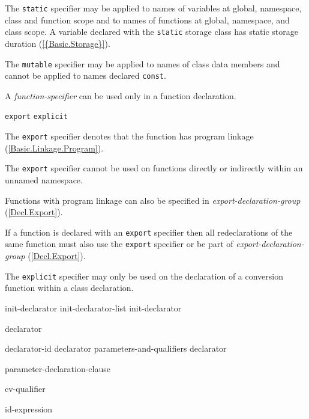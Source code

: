 \p The \texttt{static} specifier may be applied to names of variables at global,
namespace, class and function scope and to names of functions at global,
namespace, and class scope. A variable declared with the \texttt{static} storage
class has static storage duration (\ref{{Basic.Storage}}).

\p The \texttt{mutable} specifier may be applied to names of class data members
and cannot be applied to names declared \texttt{const}.


\p A \textit{function-specifier} can be used only in a function declaration.

\begin{grammar}
  \br
  \texttt{export}\br
  \texttt{explicit}
\end{grammar}

\p The \texttt{export} specifier denotes that the function has program linkage (\ref{Basic.Linkage.Program}).

\p The \texttt{export} specifier cannot be used on functions directly or indirectly within an unnamed namespace.

\p Functions with program linkage can also be specified in \textit{export-declaration-group} (\ref{Decl.Export}).

\p If a function is declared with an \texttt{export} specifier then all redeclarations of the same function must also use the \texttt{export} specifier or be part of \textit{export-declaration-group} (\ref{Decl.Export}).

\p The \texttt{explicit} specifier may only be used on the declaration of a
conversion function within a class declaration.


\begin{grammar}
  \br
  init-declarator\br
  init-declarator-list \terminal{,} init-declarator\br

  \br
  declarator \br

  \br
  declarator-id \br
  declarator parameters-and-qualifiers\br
  declarator \terminal{\lbrack}  \terminal{\rbrack} \br

  \br
  \terminal{(} parameter-declaration-clause \terminal{)}  \br

  \br
  cv-qualifier \br

  \br
  \br

  \br
  id-expression

\end{grammar}


